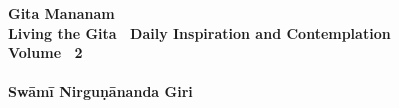 \begin{titlepage}
    \begin{center}
        \vspace*{0.5cm}
            
        {\HUGE
        \textbf{\color{black}\fontsize{40}{60}\arialUC Gita Mananam}}
        \vspace{0.5cm}
        \textbf{\\ \arialUC \color{black}Living the Gita \textemdash \ Daily Inspiration and Contemplation}\\ 
		\vspace{5.0cm}
		\textbf{{\fontsize{30}{40}\arialUC\color{black} Volume \textemdash \ 2}\\}\\		
        \vspace{6.0cm}
        \textbf{{\Large \color{black}\arialUC Swāmī  Nirguṇānanda Giri}}\\    
        
		
            
        \vfill
            
        
            
        \vspace{0.1cm}
        {\color{black}    
		
		{%
    }
        }
    \end{center}
\end{titlepage}
\nopagecolor%
